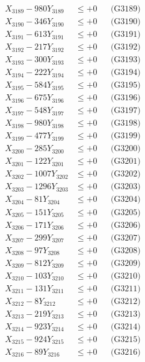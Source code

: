 \documentclass[a4paper,10pt]{article}
\begin{document}
{\begin{align}
X_{3189} - 980Y_{3189} &\leq +0 && \text{(G3189)} \\
X_{3190} - 346Y_{3190} &\leq +0 && \text{(G3190)} \\
\allowbreak
X_{3191} - 613Y_{3191} &\leq +0 && \text{(G3191)} \\
X_{3192} - 217Y_{3192} &\leq +0 && \text{(G3192)} \\
X_{3193} - 300Y_{3193} &\leq +0 && \text{(G3193)} \\
X_{3194} - 222Y_{3194} &\leq +0 && \text{(G3194)} \\
X_{3195} - 584Y_{3195} &\leq +0 && \text{(G3195)} \\
X_{3196} - 675Y_{3196} &\leq +0 && \text{(G3196)} \\
X_{3197} - 548Y_{3197} &\leq +0 && \text{(G3197)} \\
X_{3198} - 980Y_{3198} &\leq +0 && \text{(G3198)} \\
X_{3199} - 477Y_{3199} &\leq +0 && \text{(G3199)} \\
X_{3200} - 285Y_{3200} &\leq +0 && \text{(G3200)} \\
\allowbreak
X_{3201} - 122Y_{3201} &\leq +0 && \text{(G3201)} \\
X_{3202} - 1007Y_{3202} &\leq +0 && \text{(G3202)} \\
X_{3203} - 1296Y_{3203} &\leq +0 && \text{(G3203)} \\
X_{3204} - 81Y_{3204} &\leq +0 && \text{(G3204)} \\
X_{3205} - 151Y_{3205} &\leq +0 && \text{(G3205)} \\
X_{3206} - 171Y_{3206} &\leq +0 && \text{(G3206)} \\
X_{3207} - 299Y_{3207} &\leq +0 && \text{(G3207)} \\
X_{3208} - 97Y_{3208} &\leq +0 && \text{(G3208)} \\
X_{3209} - 812Y_{3209} &\leq +0 && \text{(G3209)} \\
X_{3210} - 103Y_{3210} &\leq +0 && \text{(G3210)} \\
\allowbreak
X_{3211} - 131Y_{3211} &\leq +0 && \text{(G3211)} \\
X_{3212} - 8Y_{3212} &\leq +0 && \text{(G3212)} \\
X_{3213} - 219Y_{3213} &\leq +0 && \text{(G3213)} \\
X_{3214} - 923Y_{3214} &\leq +0 && \text{(G3214)} \\
X_{3215} - 924Y_{3215} &\leq +0 && \text{(G3215)} \\
X_{3216} - 89Y_{3216} &\leq +0 && \text{(G3216)} \\

\end{align}}
\end{document}
